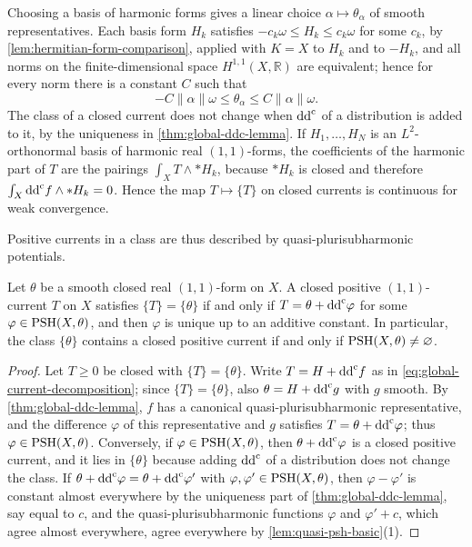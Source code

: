 Choosing a basis of harmonic forms gives a linear choice $\alpha\mapsto\theta_\alpha$ of smooth representatives. Each basis form $H_k$ satisfies $-c_k\omega\leq H_k\leq c_k\omega$ for some $c_k$, by \cref{lem:hermitian-form-comparison}, applied with $K=X$ to $H_k$ and to $-H_k$, and all norms on the finite-dimensional space $H^{1,1}(X,\mathbb R)$ are equivalent; hence for every norm there is a constant $C$ such that
\begin{equation}\label{eq:small-class-small-form}
 -C\|\alpha\|\omega\leq\theta_\alpha\leq C\|\alpha\|\omega.
\end{equation}
The class of a closed current does not change when $\mathrm{dd}^{\mathrm{c}}$ of a distribution is added to it, by the uniqueness in \cref{thm:global-ddc-lemma}. If $H_1,\ldots,H_N$ is an $L^2$-orthonormal basis of harmonic real $(1,1)$-forms, the coefficients of the harmonic part of $T$ are the pairings $\int_XT\wedge*H_k$, because $*H_k$ is closed and therefore $\int_X\mathrm{dd}^{\mathrm{c}} f\wedge*H_k=0$. Hence the map $T\mapsto\{T\}$ on closed currents is continuous for weak convergence.

Positive currents in a class are thus described by quasi-plurisubharmonic potentials.

\begin{corollary}\label{cor:current-theta-psh-potential}
Let $\theta$ be a smooth closed real $(1,1)$-form on $X$. A closed positive $(1,1)$-current $T$ on $X$ satisfies $\{T\}=\{\theta\}$ if and only if $T=\theta+\mathrm{dd}^{\mathrm{c}}\varphi$ for some $\varphi\in\mathrm{PSH}(X,\theta)$, and then $\varphi$ is unique up to an additive constant. In particular, the class $\{\theta\}$ contains a closed positive current if and only if $\mathrm{PSH}(X,\theta)\neq\varnothing$.
\end{corollary}
\begin{proof}
Let $T\geq0$ be closed with $\{T\}=\{\theta\}$. Write $T=H+\mathrm{dd}^{\mathrm{c}} f$ as in \eqref{eq:global-current-decomposition}; since $\{T\}=\{\theta\}$, also $\theta=H+\mathrm{dd}^{\mathrm{c}} g$ with $g$ smooth. By \cref{thm:global-ddc-lemma}, $f$ has a canonical quasi-plurisubharmonic representative, and the difference $\varphi$ of this representative and $g$ satisfies $T=\theta+\mathrm{dd}^{\mathrm{c}}\varphi$; thus $\varphi\in\mathrm{PSH}(X,\theta)$. Conversely, if $\varphi\in\mathrm{PSH}(X,\theta)$, then $\theta+\mathrm{dd}^{\mathrm{c}}\varphi$ is a closed positive current, and it lies in $\{\theta\}$ because adding $\mathrm{dd}^{\mathrm{c}}$ of a distribution does not change the class. If $\theta+\mathrm{dd}^{\mathrm{c}}\varphi=\theta+\mathrm{dd}^{\mathrm{c}}\varphi'$ with $\varphi,\varphi'\in\mathrm{PSH}(X,\theta)$, then $\varphi-\varphi'$ is constant almost everywhere by the uniqueness part of \cref{thm:global-ddc-lemma}, say equal to $c$, and the quasi-plurisubharmonic functions $\varphi$ and $\varphi'+c$, which agree almost everywhere, agree everywhere by \cref{lem:quasi-psh-basic}(1).
\end{proof}

